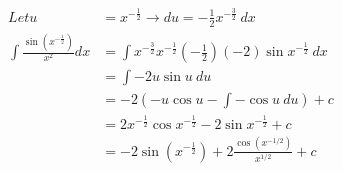 \documentclass{article}
\begin{document}
\begin{align*}
    {Let }u                                    & = x^{-\frac{1}{2}} \rightarrow du = -\frac{1}{2}x^{-\frac{3}{2}}\:dx               \\
    \int\frac{\sin{(x^{-\frac{1}{2}})}}{x^2}dx & = \int x^{-\frac{3}{2}}x^{-\frac{1}{2}}(-\frac{1}{2})(-2)\sin x^{-\frac{1}{2}}\:dx \\
                                               & = \int -2u\sin u\:du                                                               \\
                                               & = -2(-u\cos u-\int -\cos u\:du) + c                                                \\
                                               & = 2x^{-\frac{1}{2}}\cos x^{-\frac{1}{2}}-2\sin x^{-\frac{1}{2}}+c                  \\
                                               & = -2\sin(x^{-\frac{1}{2}}) + 2\frac{\cos(x^{-1/2})}{x^{1/2}} + c
\end{align*}
\end{document}

